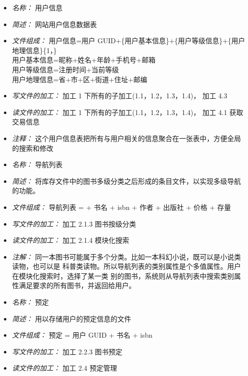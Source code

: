 \begin{itemize}
\item \textit{名称： } 用户信息
\item \textit{简述： } 网站用户信息数据表
\item \textit{文件组成： } 用户信息=用户 GUID+\{用户基本信息\}+\{用户等级信息\}+\{用户地理信息\}\{1，\} \\ 用户基本信息=昵称+姓名+年龄+手机号+邮箱 \\
用户等级信息=注册时间+当前等级 \\
用户地理信息=省+市+区+街道+住址+邮编
\item \textit{写文件的加工： } 加工 1 下所有的子加工(1.1，1.2，1.3，1.4)， 加工 4.3
\item \textit{读文件的加工： } 加工 1 下所有的子加工(1.1，1.2，1.3，1.4)， 加工 4.1 获取交易信息 
\item \textit{注释： } 这个用户信息表把所有与用户相关的信息聚合在一张表中，方便全局的搜索和修改

\end{itemize}


\vspace{-1mm}


\begin{itemize}
\item \textit{名称： }导航列表 
\item \textit{简述： }将库存文件中的图书多级分类之后形成的条目文件，以实现多级导航的功能。 
\item \textit{文件组成： }导航列表 = + 书名 + isbn + 作者 + 出版社 + 价格 + 存量 
\item \textit{写文件的加工： }加工 2.1.3 图书按级分类
\item \textit{读文件的加工： }加工 2.1.4 模块化搜索 
\item \textit{注解： }同一本图书可能属于多个分类。比如一本科幻小说，既可以是小说类读物，也可以是 科普类读物。所以导航列表的类别属性是个多值属性。用户在模块化搜索时，选择了某一类 别的图书，系统则从导航列表中搜索类别属性满足要求的所有图书，并返回给用户。

\end{itemize}


\vspace{-1mm}


\begin{itemize}
\item \textit{名称： }预定 
\item \textit{简述： }用以存储用户的预定信息的文件 
\item \textit{文件组成： }预定 = 用户 GUID + 书名 + isbn
\item \textit{写文件的加工： }加工 2.2.3 图书预定 
\item \textit{读文件的加工： }加工 2.4 预定管理

\end{itemize}


